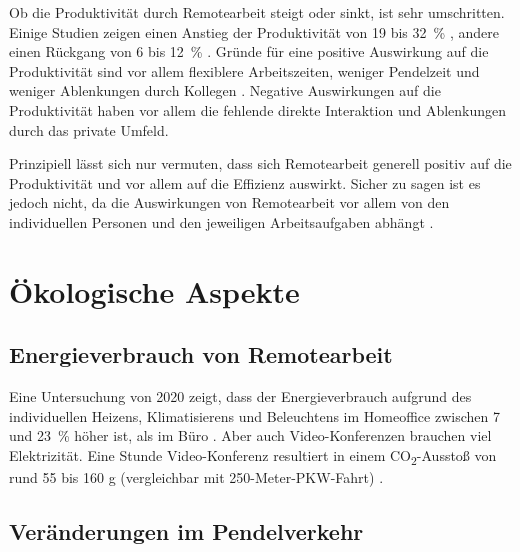 \documentclass[runningheads]{llncs}
\begin{document}
Ob die Produktivität durch Remotearbeit steigt oder sinkt, ist sehr umschritten.
Einige Studien zeigen einen Anstieg der Produktivität von 19 bis 32~\% \cite{capgemini_research_institute_future_2020, glenn_dutcher_effects_2012, owl_labs_state_2022, global_workplace_analytics_latest_2021}, andere einen Rückgang von 6 bis 12~\% \cite{emanuel_working_2023, steven_j_davis_evolution_2023}.
Gründe für eine positive Auswirkung auf die Produktivität sind vor allem flexiblere Arbeitszeiten, weniger Pendelzeit und weniger Ablenkungen durch Kollegen \cite{capgemini_research_institute_future_2020}.
Negative Auswirkungen auf die Produktivität haben vor allem die fehlende direkte Interaktion und Ablenkungen durch das private Umfeld. \cite{holand_homeoffice_2023, emanuel_working_2023}

Prinzipiell lässt sich nur vermuten, dass sich Remotearbeit generell positiv auf die Produktivität und vor allem auf die Effizienz auswirkt.
Sicher zu sagen ist es jedoch nicht, da die Auswirkungen von Remotearbeit vor allem von den individuellen Personen und den jeweiligen Arbeitsaufgaben abhängt \cite{glenn_dutcher_effects_2012, holand_homeoffice_2023}.

\section{Ökologische Aspekte}


\subsection{Energieverbrauch von Remotearbeit}

Eine Untersuchung von 2020 zeigt, dass der Energieverbrauch aufgrund des individuellen Heizens, Klimatisierens und Beleuchtens im Homeoffice zwischen 7 und 23~\% höher ist, als im Büro \cite{daniel_crow_working_2022}.
Aber auch Video-Konferenzen brauchen viel Elektrizität. 
Eine Stunde Video-Konferenz resultiert in einem CO\textsubscript{2}-Ausstoß von rund 55 bis 160 g (vergleichbar mit 250-Meter-PKW-Fahrt) \cite{deutschlandfunk_nova_internet-konferenz_2021, eisemann_treibhauseffekt_2021}.

\subsection{Veränderungen im Pendelverkehr}
\end{document}
